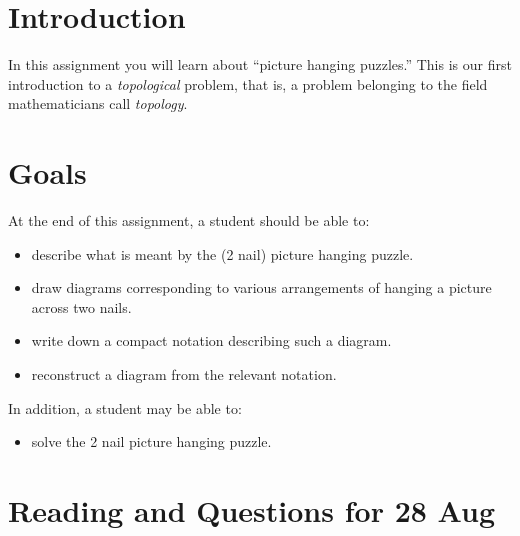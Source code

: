 \documentclass[12pt,letterpaper]{article}
\theoremstyle{definition}
\begin{document}
\setlength{\parskip}{1ex plus 0.5ex minus 0.2ex}
\setlength{\parindent}{0pt}

\pagestyle{fancy}
\cfoot{} 

\section*{Introduction}
In this assignment you will learn about ``picture hanging puzzles.''
This is our first introduction to a \emph{topological} problem, that is, a problem belonging to the field mathematicians call \emph{topology}.

\section*{Goals}
At the end of this assignment, a student should be able to:
\begin{itemize}
\item describe what is meant by the (2 nail) picture hanging puzzle.
\item draw diagrams corresponding to various arrangements of hanging a picture across two nails.
\item write down a compact notation describing such a diagram.
\item reconstruct a diagram from the relevant notation.
\end{itemize}
In addition, a student may be able to:
\begin{itemize}
\item solve the 2 nail picture hanging puzzle.
\end{itemize}

\section*{Reading and Questions for 28 Aug}
\end{document}
